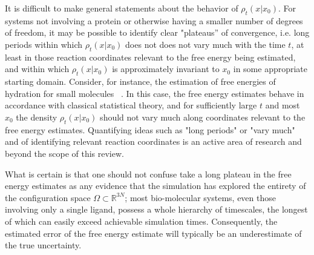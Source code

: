 \documentclass[9pt,bestpractices]{livecoms}
\begin{document}
It is difficult to make general statements about the behavior of $\rho_t (x | x_0)$. For systems not involving a protein or otherwise having a smaller number of degrees of freedom, it may be possible to identify clear "plateaus'' of convergence, i.e. long periods within which $\rho_t (x|x_0)$ does not does not vary much with the time $t$, at least in those reaction coordinates relevant to the free energy being estimated, and within which $\rho_t (x|x_0)$ is approximately invariant to $x_0$ in some appropriate starting domain. Consider, for instance, the estimation of free energies of hydration for small molecules ~\cite{paliwal2011benchmark}. In this case, the free energy estimates behave in accordance with classical statistical theory, and for sufficiently large $t$ and most $x_0$ the density $\rho_t (x | x_0)$ should not vary much along coordinates relevant to the free energy estimates. Quantifying ideas such as "long periods" or "vary much"  and of identifying relevant reaction coordinates is an active area of research and beyond the scope of this review.


What is certain is that one should not confuse take a long plateau in the free energy estimates as any evidence that the simulation has explored the entirety of the configuration space $\Omega \subset \mathbb{R}^{3N}$; most bio-molecular systems, even those involving only a single ligand, possess a whole hierarchy of timescales, the longest of which can easily exceed achievable simulation times. Consequently, the estimated error of the free energy estimate will typically be an underestimate of the true uncertainty.

\end{document}
